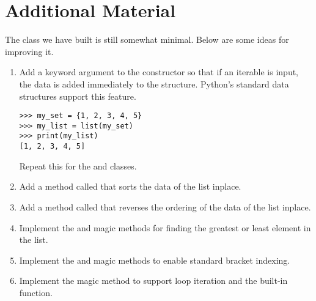 
\section*{Additional Material}

The  class we have built is still somewhat minimal.
Below are some ideas for improving it.

\begin{enumerate}
\item Add a keyword argument to the constructor so that if an iterable is input, the data is added immediately to the structure.
Python's standard data structures support this feature.
\begin{lstlisting}
>>> my_set = {1, 2, 3, 4, 5}
>>> my_list = list(my_set)
>>> print(my_list)
[1, 2, 3, 4, 5]
\end{lstlisting}
Repeat this for the  and  classes.
\item Add a method called  that sorts the data of the list inplace.
\item Add a method called  that reverses the ordering of the data of the list inplace.
\item Implement the  and  magic methods for finding the greatest or least element in the list.
\item Implement the  and  magic methods to enable standard bracket indexing.
\item Implement the  magic method to support  loop iteration and the  built-in function.
\end{enumerate}

